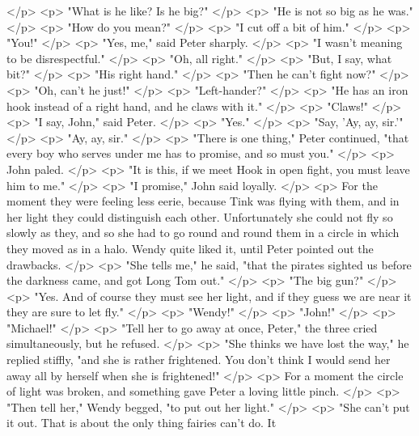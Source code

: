     </p>
    <p>
      "What is he like? Is he big?"
    </p>
    <p>
      "He is not so big as he was."
    </p>
    <p>
      "How do you mean?"
    </p>
    <p>
      "I cut off a bit of him."
    </p>
    <p>
      "You!"
    </p>
    <p>
      "Yes, me," said Peter sharply.
    </p>
    <p>
      "I wasn't meaning to be disrespectful."
    </p>
    <p>
      "Oh, all right."
    </p>
    <p>
      "But, I say, what bit?"
    </p>
    <p>
      "His right hand."
    </p>
    <p>
      "Then he can't fight now?"
    </p>
    <p>
      "Oh, can't he just!"
    </p>
    <p>
      "Left-hander?"
    </p>
    <p>
      "He has an iron hook instead of a right hand, and he claws with it."
    </p>
    <p>
      "Claws!"
    </p>
    <p>
      "I say, John," said Peter.
    </p>
    <p>
      "Yes."
    </p>
    <p>
      "Say, 'Ay, ay, sir.'"
    </p>
    <p>
      "Ay, ay, sir."
    </p>
    <p>
      "There is one thing," Peter continued, "that every boy who serves under me
      has to promise, and so must you."
    </p>
    <p>
      John paled.
    </p>
    <p>
      "It is this, if we meet Hook in open fight, you must leave him to me."
    </p>
    <p>
      "I promise," John said loyally.
    </p>
    <p>
      For the moment they were feeling less eerie, because Tink was flying with
      them, and in her light they could distinguish each other. Unfortunately
      she could not fly so slowly as they, and so she had to go round and round
      them in a circle in which they moved as in a halo. Wendy quite liked it,
      until Peter pointed out the drawbacks.
    </p>
    <p>
      "She tells me," he said, "that the pirates sighted us before the darkness
      came, and got Long Tom out."
    </p>
    <p>
      "The big gun?"
    </p>
    <p>
      "Yes. And of course they must see her light, and if they guess we are near
      it they are sure to let fly."
    </p>
    <p>
      "Wendy!"
    </p>
    <p>
      "John!"
    </p>
    <p>
      "Michael!"
    </p>
    <p>
      "Tell her to go away at once, Peter," the three cried simultaneously, but
      he refused.
    </p>
    <p>
      "She thinks we have lost the way," he replied stiffly, "and she is rather
      frightened. You don't think I would send her away all by herself when she
      is frightened!"
    </p>
    <p>
      For a moment the circle of light was broken, and something gave Peter a
      loving little pinch.
    </p>
    <p>
      "Then tell her," Wendy begged, "to put out her light."
    </p>
    <p>
      "She can't put it out. That is about the only thing fairies can't do. It
